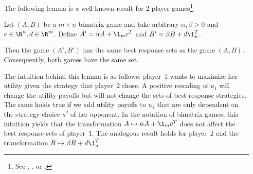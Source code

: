 The following lemma is a well-known result for $2$-player games\footnote{ See \cite[Lemma 2.1]{heyman}, \cite[Theorem 5.35]{maschler_solan_zamir_2013}, \cite[Chapter 3]{harsanyi1988general} or \cite[Proposition 3.1]{DynGT}.}:
\begin{lemma}
\label{PAT preserves lemma}
Let $(A,B)$ be a $m \times n$ bimatrix game and take arbitrary $\alpha, \beta >0$ and $c \in \R^n, d \in \R^m$. Define $A' = \alpha A + \1_m c^T$ and $B' = \beta B + d \1_n^T$.

Then the game $(A', B')$ has the same best response sets as the game $(A,B)$. Consequently, both games have the same \NE{} set.
\end{lemma}
The intuition behind this lemma is as follows:
player~$1$ wants to maximize her utility given the strategy that player~$2$ chose. A positive rescaling of $u_1$ will change the utility payoffs but will not change the sets of best response strategies. The same holds true if we add utility payoffs to $u_1$ that are only dependent on the strategy choice $s^2$ of her opponent. In the notation of bimatrix games, this intuition yields that the transformation $A \mapsto \alpha A + \1_m c^T$ does not affect the best response sets of player~$1$. The analogous result holds for player~$2$ and the transformation $B \mapsto \beta B + d \1_n^T$.

